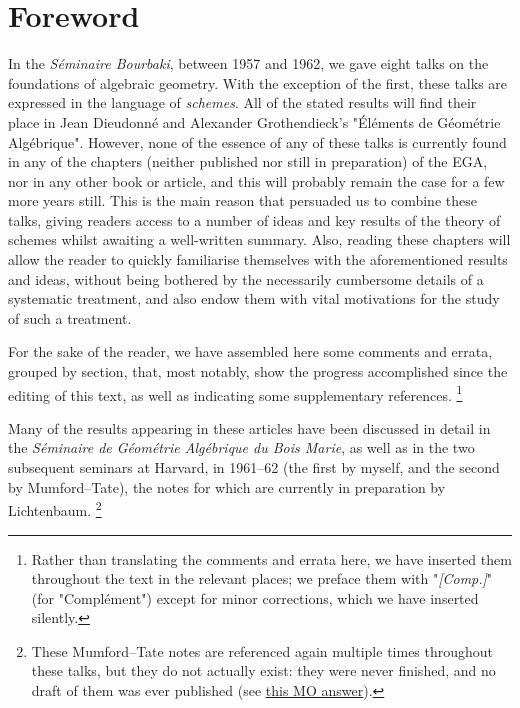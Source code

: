 \chapter*{Foreword }


  In the \emph{Séminaire Bourbaki}, between 1957 and 1962, we gave eight talks on the foundations of algebraic geometry.
  With the exception of the first, these talks are expressed in the language of \emph{schemes}.
  All of the stated results will find their place in Jean Dieudonné and Alexander Grothendieck's "Éléments de Géométrie Algébrique".
  However, none of the essence of any of these talks is currently found in any of the chapters (neither published nor still in preparation) of the EGA, nor in any other book or article, and this will probably remain the case for a few more years still.
  This is the main reason that persuaded us to combine these talks, giving readers access to a number of ideas and key results of the theory of schemes whilst awaiting a well-written summary.
  Also, reading these chapters will allow the reader to quickly familiarise themselves with the aforementioned results and ideas, without being bothered by the necessarily cumbersome details of a systematic treatment, and also endow them with vital motivations for the study of such a treatment.



  For the sake of the reader, we have assembled here some comments and errata, grouped by section, that, most notably, show the progress accomplished since the editing of this text, as well as indicating some supplementary references.
  \footnote{Rather than translating the comments and errata here, we have inserted them throughout the text in the relevant places; we preface them with "\emph{[Comp.]}" (for "Complément") except for minor corrections, which we have inserted silently.}


  Many of the results appearing in these articles have been discussed in detail in the \emph{Séminaire de Géométrie Algébrique du Bois Marie}, as well as in the two subsequent seminars at Harvard, in 1961–62 (the first by myself, and the second by Mumford–Tate), the notes for which are currently in preparation by Lichtenbaum.
  \footnote{These Mumford–Tate notes are referenced again multiple times throughout these talks, but they do not actually exist: they were never finished, and no draft of them was ever published (see \href{https://mathoverflow.net/a/452230/73622}{this MO answer}).}

